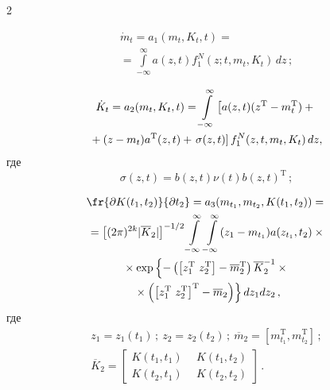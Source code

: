 \begin{multicols}{2}
  \vspace*{-12pt}
  
  \noindent
  \begin{multline}
     \dot{m}_t=a_1(m_t,K_t,t)={}\\
     {}=\int\limits_{-\infty}^\infty a(z,t)f_1^N 
(z;t,m_t,K_t)\,dz\,;\label{e9-sin}
     \end{multline}
     
     \noindent
     \begin{multline}
     \dot{K}_t =a_2(m_t,K_t,t)=\int\limits_{-\infty}^\infty \left[ a(z,t)(z^{\mathrm{T}}-
m_t^{\mathrm{T}})+{}\right.\\
\hspace*{-1mm}{}+(z-m_t)a^{\mathrm{T}}(z,t)+ %
\left.\sigma(z,t)\right] f_1^N(z,t,m_t,K_t)\,dz,\!
     \label{e10-sin}
     \end{multline}
     где
     \begin{equation*}
     \sigma(z,t)=b(z,t)\nu(t) b(z,t)^{\mathrm{T}}\,;
     \end{equation*}
     
     \vspace*{-12pt}
     
     \noindent
     \begin{multline}
     \fr{\partial K(t_1,t_2)}{\partial t_2}=a_3(m_{t_1},m_{t_2}, K(t_1,t_2))={}\\
     {}=\left[ 
(2\pi)^{2k}\vert \overline{K}_2\vert \right]^{-1/2}\int\limits_{-\infty}^\infty  
\int\limits_{-\infty}^\infty (z_1-m_{t_1})a(z_{t_1},t_2)\times{}\\
     {}\times 
     \exp \left\{ -\left(\left [ z_1^{\mathrm{T}}\ z_2^{\mathrm{T}}\right] -
     \overline{m}_2^{\mathrm{T}}\right) 
\overline{K}_2^{-1} \times{}\right.\\
\left.{}\times\left( \left[ z_1^{\mathrm{T}}\ z_2^{\mathrm{T}}\right]^{\mathrm{T}} -\overline{m}_2\right) 
\right\}dz_1dz_2\,,
     \label{e11-sin}
     \end{multline}
где
\begin{gather*}
z_1= z_1(t_1)\,;\  z_2=z_2(t_2)\,;\  \overline{m}_2=\left[ 
m^{\mathrm{T}}_{t_1},m^{\mathrm{T}}_{t_2}\right]\,;\\
\overline{K}_2=\begin{bmatrix}
K(t_1,t_1) & \ \ K(t_1,t_2)\\[6pt]
K(t_2,t_{1})&\ \  K(t_2,t_2)
\end{bmatrix}\,.
\end{gather*}
     

\end{multicols}

